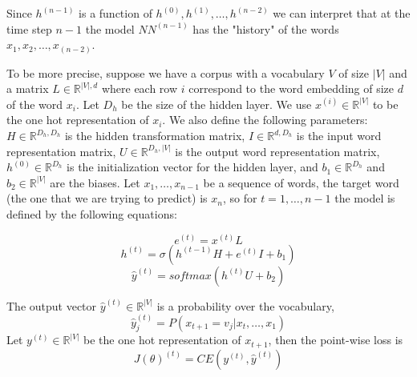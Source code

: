 \documentclass{article}
\begin{document}
Since $h^{(n-1)}$ is a function of $h^{(0)},h^{(1)}, \dots, h^{(n-2)}$ we can interpret that at the time step $n-1$ the model $NN^{(n-1)}$ has the "history" of the words $x_1, x_2, \dots, x_{(n-2)}$.

To be more precise, suppose we have a corpus with a vocabulary $V$ of size $|V|$ and a matrix $L \in \mathbb{R}^{|V|,d}$ where each row $i$ correspond to the word embedding of size $d$ of the word $x_{i}$. Let $D_{h}$ be the size of the hidden layer. We use $x^{(i)} \in \mathbb{R}^{|V|}$ to be the one hot representation of $x_{i}$. We also define the following parameters: $H \in \mathbb{R}^{D_{h},D_{h}}$ is the hidden transformation matrix, $I \in \mathbb{R}^{d,D_{h}}$ is the input word representation matrix, $U \in \mathbb{R}^{D_{h},|V|}$ is the output word representation matrix, $h^{(0)} \in \mathbb{R}^{D_{h}}$ is the initialization vector for the hidden layer, and $b_{1} \in \mathbb{R}^{D_{h}}$ and $b_{2} \in \mathbb{R}^{|V|}$  are the biases. Let $x_{1}, \dots,x_{n-1}$ be a sequence of words, the target word (the one that we are trying to predict) is $x_{n}$, so for $t= 1, \dots, n-1$ the model is defined by the following equations:

\begin{equation}\label{eq:23}
e^{(t)} = x^{(t)}L
\end{equation}
 \begin{equation}\label{eq:24}
h^{(t)} = \sigma(h^{(t-1)}H + e^{(t)} I + b_{1})
\end{equation}
\begin{equation}\label{eq:25}
\hat{y}^{(t)} = softmax(h^{(t)}U + b_{2})
\end{equation}

The output vector $\hat{y}^{(t)} \in \mathbb{R}^{|V|}$ is a probability over the vocabulary, 
\begin{equation}\label{eq:26}
\hat{y}^{(t)}_{j} = P(x_{t+1} = v_{j} | x_{t}, \dots,x_{1})
\end{equation}
Let $y^{(t)} \in \mathbb{R}^{|V|}$ be the one hot representation of $x_{t+1}$, then the point-wise loss is
\begin{equation}\label{eq:27}
J(\theta)^{(t)} = CE(y^{(t)},\hat{y}^{(t)})
\end{equation}
\end{document}
